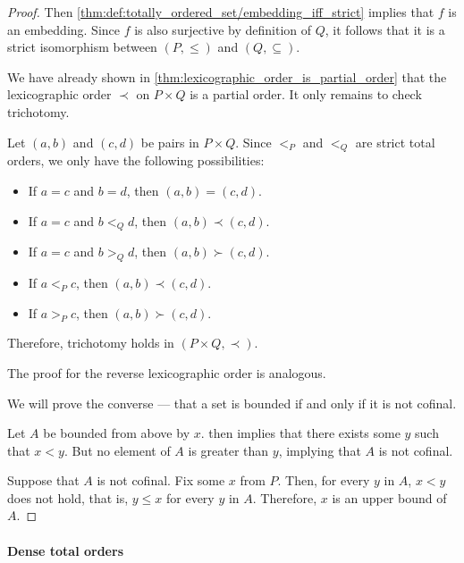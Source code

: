 \begin{proof}
  Then \cref{thm:def:totally_ordered_set/embedding_iff_strict} implies that \( f \) is an embedding. Since \( f \) is also surjective by definition of \( Q \), it follows that it is a strict isomorphism between \( (P, \leq) \) and \( (Q, \subseteq) \).

   We have already shown in \cref{thm:lexicographic_order_is_partial_order} that the lexicographic order \( \prec \) on \( P \times Q \) is a partial order. It only remains to check trichotomy.

  Let \( (a, b) \) and \( (c, d) \) be pairs in \( P \times Q \). Since \( <_P \) and \( <_Q \) are strict total orders, we only have the following possibilities:
  \begin{itemize}
    \item If \( a = c \) and \( b = d \), then \( (a, b) = (c, d) \).
    \item If \( a = c \) and \( b <_Q d \), then \( (a, b) \prec (c, d) \).
    \item If \( a = c \) and \( b >_Q d \), then \( (a, b) \succ (c, d) \).
    \item If \( a <_P c \), then \( (a, b) \prec (c, d) \).
    \item If \( a >_P c \), then \( (a, b) \succ (c, d) \).
  \end{itemize}

  Therefore, trichotomy holds in \( (P \times Q, \prec) \).

  The proof for the reverse lexicographic order is analogous.

   We will prove the converse --- that a set is bounded if and only if it is not cofinal.

  \SufficiencySubProof* Let \( A \) be bounded from above by \( x \).  then implies that there exists some \( y \) such that \( x < y \). But no element of \( A \) is greater than \( y \), implying that \( A \) is not cofinal.

  \NecessitySubProof* Suppose that \( A \) is not cofinal. Fix some \( x \) from \( P \). Then, for every \( y \) in \( A \), \( x < y \) does not hold, that is, \( y \leq x \) for every \( y \) in \( A \). Therefore, \( x \) is an upper bound of \( A \).
\end{proof}

\paragraph{Dense total orders}

